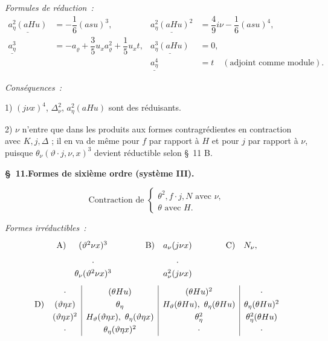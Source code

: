 \documentclass[11pt]{article}
\newcommand{\A}{\Delta}
\newcommand{\R}{\varrho}
\begin{document}
\noindent\emph{Formules de réduction :}
\[
\tag{11}
\begin{array}{rl|rl}
\underline{a_\eta^2(aHu)}&=-\dfrac16(asu)^3,&
\underline{a_\eta^2(aHu)^2}&=\dfrac49 i\nu-\dfrac16(asu)^4,\\[0.7em]
\underline{a_\eta^3}&=-a_\R+\dfrac35u_xa_\R^2+\dfrac15u_xt,
& \underline{a_\eta^3(aHu)}&=0,\\[0.7em]
&&\underline{a_\eta^4}&=t\quad(\text{adjoint comme module}).
\end{array}
\]

\noindent\emph{Conséquences :}

1) $(j\nu x)^4$, $\A_\nu^2$, $a_\eta^2(aHu)$ sont des réduisants.

2) $\nu$ n'entre que dans les produits aux formes contragrédientes en contraction avec $K,j,\A$ ; il en va de même pour $f$ par rapport à $H$ et pour $j$ par rapport à $\nu$, puisque $\theta_\nu(\vartheta\cdot j,\nu,x)^3$ devient réductible selon \S\ 11 B.

\begin{center}
\textbf{\S\ 11.\quad Formes de sixième ordre (système III).}
\end{center}
\[
\text{Contraction de }\left\{\begin{array}{l}
\theta^2,
f\cdot j,
N \text{ avec }\nu,\\
\theta\text{ avec }H.
\end{array}\right.
\]

\noindent\emph{Formes irréductibles :}
\[
\renewcommand{\arraystretch}{1.25}
\begin{array}{@{}r@{\quad}c@{\qquad\qquad}r@{\quad}c@{\qquad\qquad}r@{\quad}c@{}}
\text{A)}&(\vartheta^2\nu x)^3&\text{B)}&a_\nu(j\nu x)&\text{C)}&N_\nu,\\[0.45em]
&\cdot&&\cdot&&\\[-0.1em]
&\theta_\nu(\vartheta^2\nu x)^3&&a_\nu^2(j\nu x)&&
\end{array}
\]
\[
\renewcommand{\arraystretch}{1.25}
\begin{array}{@{}r@{\quad}c|c|c|c@{}}
&\cdot&(\theta Hu)&(\theta Hu)^2&\cdot\\
\text{D)}&(\vartheta\eta x)&\theta_\eta&H_\vartheta(\theta Hu),\ \theta_\eta(\theta Hu)&\theta_\eta(\theta Hu)^2\\
&(\vartheta\eta x)^2&H_\vartheta(\vartheta\eta x),\ \theta_\eta(\vartheta\eta x)&\theta_\eta^2&\theta_\eta^2(\theta Hu)\\
&\cdot&\theta_\eta(\vartheta\eta x)^2&\cdot&\cdot
\end{array}
\]
\end{document}
